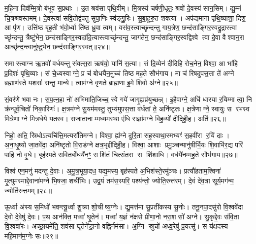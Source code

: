 म॒हि॒ना दिव॑म्मि॒त्रो ब॑भूव स॒प्रथाः। उ॒त श्रव॑सा पृथि॒वीम्। मि॒त्रस्य॑ चर्\mbox{}षणी॒धृतः॒ श्रवो॑ दे॒वस्य॑ सान॒सिम्। द्यु॒म्नं चि॒त्रश्र॑वस्तमम्। दे॒वस्त्वा॑ सवि॒तोद्व॑पतु सुपा॒णिः स्व॑ङ्गु॒॒रिः। सु॒बा॒हुरु॒त शक्त्या। अप॑द्यमाना पृथि॒व्याशा॒ दिश॒ आ पृ॑ण। उत्ति॑ष्ठ बृह॒ती भ॑वो॒र्ध्वा ति॑ष्ठ ध्रु॒वा त्वम्। वस॑व॒स्त्वाच्छृ॑न्दन्तु गाय॒त्रेण॒ छन्द॑साङ्गिर॒स्वद्रु॒द्रास्त्वा च्छृ॑न्दन्तु॒ त्रैष्टु॑भेन॒ छन्द॑साङ्गिर॒स्वदा॑दि॒त्यास्त्वाच्छृ॑न्दन्तु॒ जाग॑तेन॒ छन्द॑साङ्गिर॒स्वद्विश्वे त्वा दे॒वा वैश्वान॒रा आच्छृ॑न्द॒न्त्वानु॑ष्टुभेन॒ छन्द॑साङ्गिर॒स्वत्॥२४॥

{\anuvakamend[{पत्नी॑रि॒मा रु॒द्रास्त्वाच्छृ॑न्द॒न्त्वेका॒न्नविꣳ॑श॒तिश्च॑॥६॥}]}

समास्त्वाग्न ऋ॒तवो॑ वर्धयन्तु संवत्स॒रा ऋष॑यो॒ यानि॑ स॒त्या। सं दि॒व्येन॑ दीदिहि रोच॒नेन॒ विश्वा॒ आ भा॑हि प्र॒दिशः॑ पृथि॒व्याः। सं चे॒ध्यस्वाग्ने॒ प्र च॑ बोधयैन॒मुच्च॑ तिष्ठ मह॒ते सौभ॑गाय। मा च॑ रिषदुपस॒त्ता ते॑ अग्ने ब्र॒ह्माण॑स्ते य॒शसः॑ सन्तु॒ मान्ये। त्वाम॑ग्ने वृणते ब्राह्म॒णा इ॒मे शि॒वो अ॑ग्ने॥२५॥

सं॒वर॑णे भवा नः। स॒प॒त्न॒हा नो॑ अभिमाति॒जिच्च॒ स्वे गये॑ जागृ॒ह्यप्र॑युच्छन्न्। इ॒हैवाग्ने॒ अधि॑ धारया र॒यिम्मा त्वा॒ नि क्र॑न्पूर्व॒चितो॑ निका॒रिणः॑। क्ष॒त्रम॑ग्ने सु॒यम॑मस्तु॒ तुभ्य॑मुपस॒त्ता व॑र्धतां ते॒ अनि॑ष्टृतः। क्ष॒त्रेणाग्ने॒ स्वायुः॒ स र॑भस्व मि॒त्रेणाग्ने मित्र॒धेये॑ यतस्व। स॒जा॒तानाम्मध्यम॒स्था ए॑धि॒ राज्ञा॑मग्ने विह॒व्यो॑ दीदिही॒ह। अति॑॥२६॥

निहो॒ अति॒ स्रिधोऽत्यचि॑त्ति॒मत्यरा॑तिमग्ने। विश्वा॒ ह्य॑ग्ने दुरि॒ता सह॒स्वाथा॒स्मभ्यꣳ॑ स॒हवी॑रा र॒यिं दाः। अ॒ना॒धृ॒ष्यो जा॒तवे॑दा॒ अनि॑ष्टृतो वि॒राड॑ग्ने क्षत्र॒भृद्दी॑दिही॒ह। विश्वा॒ आशाः प्रमु॒ञ्चन्मानु॑षीर्भि॒यः शि॒वाभि॑र॒द्य परि॑ पाहि नो वृ॒धे। बृह॑स्पते सवितर्बो॒धयै॑न॒ꣳ॒ सशि॑तं चित्संत॒रा स शि॑शाधि। व॒र्धयै॑नम्मह॒ते सौभ॑गाय॥२७॥

विश्व॑ एन॒मनु॑ मदन्तु दे॒वाः। अ॒मु॒त्र॒भूया॒दध॒ यद्य॒मस्य॒ बृह॑स्पते अ॒भिश॑स्ते॒रमु॑ञ्चः। प्रत्यौ॑हताम॒श्विना॑ मृ॒त्युम॑स्माद्दे॒वाना॑मग्ने भि॒षजा॒ शची॑भिः। उद्व॒यं तम॑स॒स्परि॒ पश्य॑न्तो॒ ज्योति॒रुत्त॑रम्। दे॒वं दे॑व॒त्रा सूर्य॒मग॑न्म॒ ज्योति॑रुत्त॒मम्॥२८॥

{\anuvakamend[{इ॒मे शि॒वो अ॒ग्नेऽति॒ सौभ॑गाय॒ चतु॑स्त्रिशच्च॥७॥}]}

ऊ॒र्ध्वा अ॑स्य स॒मिधो॑ भवन्त्यू॒र्ध्वा शु॒क्रा शो॒चीष्य॒ग्नेः। द्यु॒मत्त॑मा सु॒प्रती॑कस्य सू॒नोः। तनू॒नपा॒दसु॑रो वि॒श्ववे॑दा दे॒वो दे॒वेषु॑ दे॒वः। प॒थ आन॑क्ति॒ मध्वा॑ घृ॒तेन॑। मध्वा॑ य॒ज्ञं न॑क्षसे प्रीणा॒नो नरा॒शसो॑ अग्ने। सु॒कृद्दे॒वः स॑वि॒ता वि॒श्ववा॑रः। अच्छा॒यमे॑ति॒ शव॑सा घृ॒तेने॑डा॒नो वह्नि॒र्नम॑सा। अ॒ग्नि स्रुचो॑ अध्व॒रेषु॑ प्र॒यत्सु॑। स य॑क्षदस्य महि॒मान॑म॒ग्नेः सः॥२९॥

